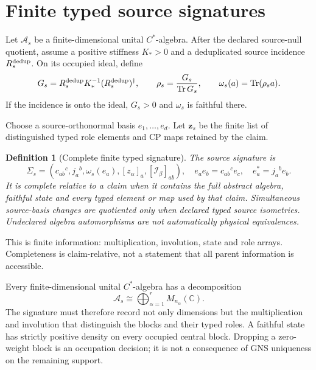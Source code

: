 \documentclass[11pt]{article}
\newtheorem{definition}{Definition}
\newcommand{\Tr}{\operatorname{Tr}}
\begin{document}
\section{Finite typed source signatures}

Let \(\mathcal A_s\) be a finite-dimensional unital \(C^*\)-algebra.  After
the declared source-null quotient, assume a positive stiffness \(K_*>0\) and
a deduplicated source incidence \(R_s^{\rm dedup}\).  On its occupied ideal,
define
\begin{equation}
 G_s=R_s^{\rm dedup}K_*^{-1}(R_s^{\rm dedup})^\dagger,
 \qquad
 \rho_s=\frac{G_s}{\Tr G_s},
 \qquad
 \omega_s(a)=\Tr(\rho_sa).
 \label{eq:finite-source-state}
\end{equation}
If the incidence is onto the ideal, \(G_s>0\) and \(\omega_s\) is faithful
there.

Choose a source-orthonormal basis \(e_1,\ldots,e_d\).  Let
\(\mathbf z_s\) be the finite list of distinguished typed role elements and
CP maps retained by the claim.

\begin{definition}[Complete finite typed signature]
The source signature is
\begin{equation}
 \Sigma_s=
 \left(c_{ab}{}^c,j_a{}^b,\omega_s(e_a),
 [z_\alpha]_a,[\mathcal I_\beta]_{ab}\right),
 \quad
 e_ae_b=c_{ab}{}^ce_c,
 \quad e_a^*=j_a{}^be_b.
 \label{eq:signature}
\end{equation}
It is \emph{complete relative to a claim} when it contains the full abstract
algebra, faithful state and every typed element or map used by that claim.
Simultaneous source-basis changes are quotiented only when declared typed
source isometries.  Undeclared algebra automorphisms are not automatically
physical equivalences.
\end{definition}

This is finite information: multiplication, involution, state and role arrays.
Completeness is claim-relative, not a statement that all parent information is
accessible.

Every finite-dimensional unital \(C^*\)-algebra has a decomposition
\begin{equation}
 \mathcal A_s\cong\bigoplus_{\alpha=1}^{r}M_{n_\alpha}(\mathbb C).
 \label{eq:wedderburn}
\end{equation}
The signature must therefore record not only dimensions but the multiplication
and involution that distinguish the blocks and their typed roles.  A faithful
state has strictly positive density on every occupied central block.  Dropping
a zero-weight block is an occupation decision; it is not a consequence of GNS
uniqueness on the remaining support.
\end{document}
